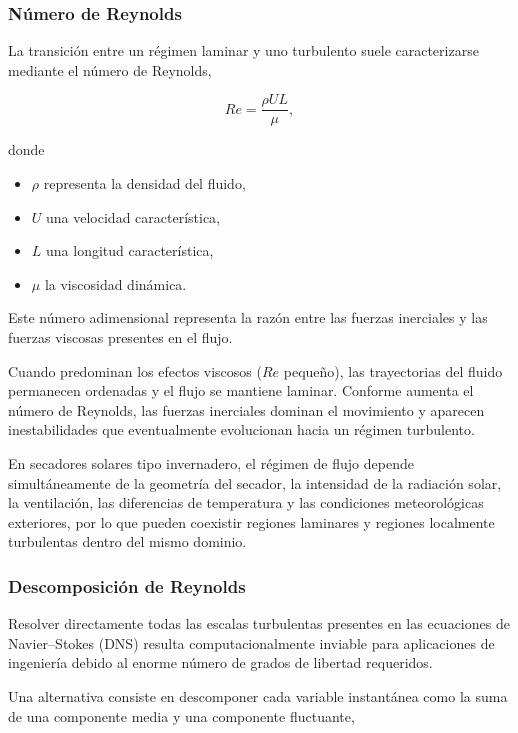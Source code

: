 \subsubsection{Número de Reynolds}

La transición entre un régimen laminar y uno turbulento suele caracterizarse mediante el número de Reynolds,

\begin{equation}
Re=\frac{\rho UL}{\mu},
\end{equation}

donde

\begin{itemize}
\item $\rho$ representa la densidad del fluido,
\item $U$ una velocidad característica,
\item $L$ una longitud característica,
\item $\mu$ la viscosidad dinámica.
\end{itemize}

Este número adimensional representa la razón entre las fuerzas inerciales y las fuerzas viscosas presentes en el flujo.

Cuando predominan los efectos viscosos ($Re$ pequeño), las trayectorias del fluido permanecen ordenadas y el flujo se mantiene laminar. Conforme aumenta el número de Reynolds, las fuerzas inerciales dominan el movimiento y aparecen inestabilidades que eventualmente evolucionan hacia un régimen turbulento.

En secadores solares tipo invernadero, el régimen de flujo depende simultáneamente de la geometría del secador, la intensidad de la radiación solar, la ventilación, las diferencias de temperatura y las condiciones meteorológicas exteriores, por lo que pueden coexistir regiones laminares y regiones localmente turbulentas dentro del mismo dominio.

\subsubsection{Descomposición de Reynolds}

Resolver directamente todas las escalas turbulentas presentes en las ecuaciones de Navier--Stokes (DNS) resulta computacionalmente inviable para aplicaciones de ingeniería debido al enorme número de grados de libertad requeridos.

Una alternativa consiste en descomponer cada variable instantánea como la suma de una componente media y una componente fluctuante,

